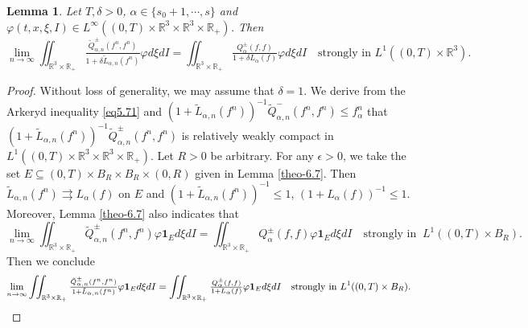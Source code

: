 \documentclass[reqno,11pt]{amsart}
\newtheorem{lemma}{Lemma}[section]
\numberwithin{equation}{section}
\def\R{\mathbb{R}}
\begin{document}
\begin{lemma}\label{QL L1}
	Let $T, \delta > 0$, $\alpha \in \{s_0+1,\cdots,s\}$ and $\varphi (t, x, \xi, I) \in L^\infty ((0,T)\times \R^3\times \R^3 \times \R_+)$. Then
	\begin{equation*}
		\lim \limits_{n\rightarrow \infty} \iint_{ \R^3 \times \R_+} \tfrac{\tilde{Q}^\pm _{\alpha,n}(f^n,f^n)}{1+\delta \tilde{L}_{\alpha,n}(f^n)}\varphi d\xi dI = \iint_{ \R^3 \times \R_+} \tfrac{Q^\pm _{\alpha}(f,f)}{1+\delta L_{\alpha}(f)}\varphi d\xi dI \quad \text{strongly in } L^1((0,T)\times \R^3).
	\end{equation*}
\end{lemma}
\begin{proof}
	Without loss of generality, we may assume that $\delta=1$. We derive from the Arkeryd inequality \eqref{eq5.71} and $(1+ \tilde{L}_{\alpha,n}(f^n))^{-1}\tilde{Q}^- _{\alpha,n}(f^n,f^n) \leq f^n_\alpha$ that $(1+ \tilde{L}_{\alpha,n}(f^n))^{-1}\tilde{Q}^\pm _{\alpha,n}(f^n,f^n)$ is relatively weakly compact in $L^1((0,T)\times \R^3 \times \R^3 \times \R_+)$. Let $R > 0$ be arbitrary. For any $\epsilon > 0$, we take the set $ E \subseteq (0,T)\times B_R \times B_R\times (0,R) $ given in Lemma \ref{theo-6.7}. Then $ \tilde{L}_{\alpha,n}(f^n) \rightrightarrows L_{\alpha}(f) $ on $E$ and $ (1+ \tilde{L}_{\alpha,n}(f^n))^{-1} \leq 1 $, $(1+ {L}_{\alpha}(f))^{-1} \leq 1$. Moreover, Lemma \ref{theo-6.7} also indicates that
\begin{equation*}
		\lim \limits_{n\rightarrow \infty } \iint_{ \R^3 \times \R_+} \tilde{Q}^\pm_{\alpha ,n} (f^n,f^n) \varphi \mathbf{1}_E d\xi dI =  \iint_{ \R^3 \times \R_+} Q^\pm_{\alpha } (f,f) \varphi \mathbf{1}_E d\xi dI \quad \text{strongly in } \ L^1 ((0,T)\times B_R).
	\end{equation*}
Then we conclude 
\begin{equation}\label{E}{\small
\begin{aligned}
\lim \limits_{n\rightarrow \infty} \iint_{ \R^3 \times \R_+} \tfrac{\tilde{Q}^\pm _{\alpha,n}(f^n,f^n)}{1+ \tilde{L}_{\alpha,n}(f^n)}\varphi \mathbf{1}_E d\xi dI = \iint_{ \R^3 \times \R_+} \tfrac{Q^\pm _{\alpha}(f,f)}{1+L_{\alpha}(f)}\varphi \mathbf{1}_E d\xi dI \quad \text{strongly in } L^1((0,T)\times B_R).
\end{aligned}}
\end{equation}


\end{proof}
\end{document}
